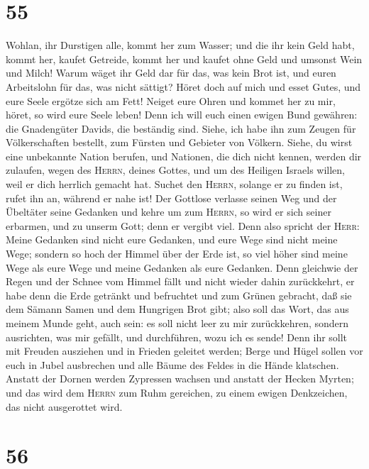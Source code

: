 \hypertarget{section-54}{%
\section{55}\label{section-54}}

 Wohlan, ihr Durstigen alle, kommt her zum Wasser; und die
ihr kein Geld habt, kommt her, kaufet Getreide, kommt her und kaufet
ohne Geld und umsonst Wein und Milch!  Warum wäget ihr
Geld dar für das, was kein Brot ist, und euren Arbeitslohn für das, was
nicht sättigt? Höret doch auf mich und esset Gutes, und eure Seele
ergötze sich am Fett!  Neiget eure Ohren und kommet her zu
mir, höret, so wird eure Seele leben! Denn ich will euch einen ewigen
Bund gewähren: die Gnadengüter Davids, die beständig sind.
 Siehe, ich habe ihn zum Zeugen für Völkerschaften
bestellt, zum Fürsten und Gebieter von Völkern.  Siehe, du
wirst eine unbekannte Nation berufen, und Nationen, die dich nicht
kennen, werden dir zulaufen, wegen des \textsc{Herrn}, deines Gottes,
und um des Heiligen Israels willen, weil er dich herrlich gemacht hat.
 Suchet den \textsc{Herrn}, solange er zu finden ist,
rufet ihn an, während er nahe ist!  Der Gottlose verlasse
seinen Weg und der Übeltäter seine Gedanken und kehre um zum
\textsc{Herrn}, so wird er sich seiner erbarmen, und zu unserm Gott;
denn er vergibt viel.  Denn also spricht der
\textsc{Herr}: Meine Gedanken sind nicht eure Gedanken, und eure Wege
sind nicht meine Wege;  sondern so hoch der Himmel über
der Erde ist, so viel höher sind meine Wege als eure Wege und meine
Gedanken als eure Gedanken.  Denn gleichwie der Regen und
der Schnee vom Himmel fällt und nicht wieder dahin zurückkehrt, er habe
denn die Erde getränkt und befruchtet und zum Grünen gebracht, daß sie
dem Sämann Samen und dem Hungrigen Brot gibt;  also soll
das Wort, das aus meinem Munde geht, auch sein: es soll nicht leer zu
mir zurückkehren, sondern ausrichten, was mir gefällt, und durchführen,
wozu ich es sende!  Denn ihr sollt mit Freuden ausziehen
und in Frieden geleitet werden; Berge und Hügel sollen vor euch in Jubel
ausbrechen und alle Bäume des Feldes in die Hände klatschen.
 Anstatt der Dornen werden Zypressen wachsen und anstatt
der Hecken Myrten; und das wird dem \textsc{Herrn} zum Ruhm gereichen,
zu einem ewigen Denkzeichen, das nicht ausgerottet wird.

\hypertarget{section-55}{%
\section{56}\label{section-55}}

